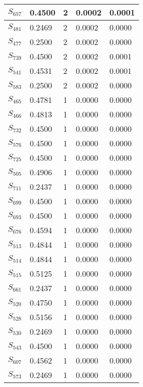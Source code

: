 \begin{xltabular}{\textwidth}{|X|X|X|X|X|}
 $S_{657}$ & 0.4500 & 2 & 0.0002 & 0.0001 \\ \hline
 $S_{481}$ & 0.2469 & 2 & 0.0002 & 0.0000 \\ \hline
 $S_{477}$ & 0.2500 & 2 & 0.0002 & 0.0000 \\ \hline
 $S_{739}$ & 0.4500 & 2 & 0.0002 & 0.0001 \\ \hline
 $S_{541}$ & 0.4531 & 2 & 0.0002 & 0.0001 \\ \hline
 $S_{583}$ & 0.2500 & 2 & 0.0002 & 0.0000 \\ \hline
 $S_{465}$ & 0.4781 & 1 & 0.0000 & 0.0000 \\ \hline
 $S_{466}$ & 0.4813 & 1 & 0.0000 & 0.0000 \\ \hline
 $S_{732}$ & 0.4500 & 1 & 0.0000 & 0.0000 \\ \hline
 $S_{576}$ & 0.4500 & 1 & 0.0000 & 0.0000 \\ \hline
 $S_{725}$ & 0.4500 & 1 & 0.0000 & 0.0000 \\ \hline
 $S_{505}$ & 0.4906 & 1 & 0.0000 & 0.0000 \\ \hline
 $S_{711}$ & 0.2437 & 1 & 0.0000 & 0.0000 \\ \hline
 $S_{699}$ & 0.4500 & 1 & 0.0000 & 0.0000 \\ \hline
 $S_{693}$ & 0.4500 & 1 & 0.0000 & 0.0000 \\ \hline
 $S_{676}$ & 0.4594 & 1 & 0.0000 & 0.0000 \\ \hline
 $S_{513}$ & 0.4844 & 1 & 0.0000 & 0.0000 \\ \hline
 $S_{514}$ & 0.4844 & 1 & 0.0000 & 0.0000 \\ \hline
 $S_{515}$ & 0.5125 & 1 & 0.0000 & 0.0000 \\ \hline
 $S_{661}$ & 0.2437 & 1 & 0.0000 & 0.0000 \\ \hline
 $S_{520}$ & 0.4750 & 1 & 0.0000 & 0.0000 \\ \hline
 $S_{528}$ & 0.5156 & 1 & 0.0000 & 0.0000 \\ \hline
 $S_{530}$ & 0.2469 & 1 & 0.0000 & 0.0000 \\ \hline
 $S_{543}$ & 0.4500 & 1 & 0.0000 & 0.0000 \\ \hline
 $S_{607}$ & 0.4562 & 1 & 0.0000 & 0.0000 \\ \hline
 $S_{573}$ & 0.2469 & 1 & 0.0000 & 0.0000 \\ \hline
    \end{xltabular}
    